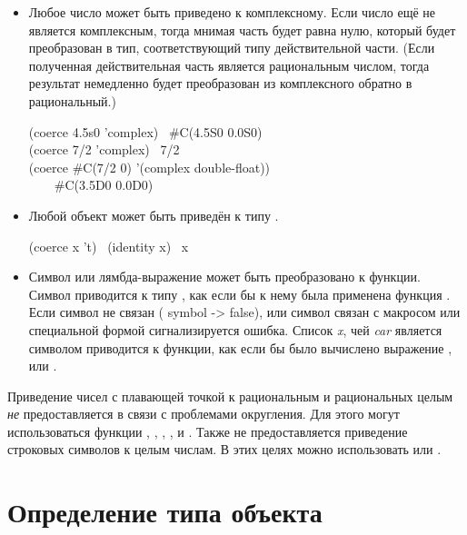 \begin{defun}[Function]
\begin{itemize}
\item
Любое число может быть приведено к комплексному. Если число ещё не является
комплексным, тогда мнимая часть будет равна нулю, который будет преобразован в
тип, соответствующий типу действительной части. (Если полученная действительная
часть является рациональным числом, тогда результат немедленно будет
преобразован из комплексного обратно в рациональный.)

\begin{lisp}
(coerce 4.5s0 'complex) \EV\ \#C(4.5S0 0.0S0) \\
(coerce 7/2 'complex) \EV\ 7/2 \\
(coerce \#C(7/2 0) '(complex double-float)) \\
~~~\EV\ \#C(3.5D0 0.0D0)
\end{lisp}

\item
Любой объект может быть приведён к типу .
\begin{lisp}
(coerce x 't) \EQ\ (identity x) \EQ\ x
\end{lisp}

\end{itemize}
\begin{newer}
\begin{itemize}
\item
Символ или лямбда-выражение может быть преобразовано к функции.
Символ приводится к типу , как если бы к нему была применена
функция . Если символ не связан ( symbol ->
false), или символ связан с макросом или специальной формой сигнализируется
ошибка.
Список \emph{x}, чей \emph{car} является символом  приводится к
функции, как если бы было вычислено выражение ,
или .
\end{itemize}
\end{newer}

Приведение чисел с плавающей точкой к рациональным и рациональных целым
\emph{не} предоставляется в связи с проблемами округления. Для этого могут
использоваться функции , ,
, ,  и . Также не предоставляется
приведение строковых символов к целым числам. В этих целях можно использовать
 или .
\end{defun}

\section{Определение типа объекта}

